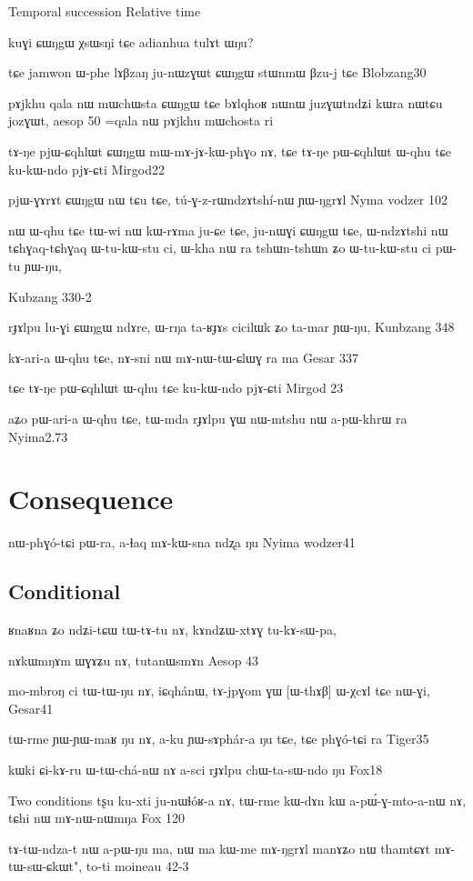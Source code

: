 \documentclass[oldfontcommands,oneside,a4paper,11pt]{memoir}
\begin{document}
Temporal succession
Relative time

kuɣi ɕɯŋgɯ χsɯsŋi tɕe adianhua tulɤt ɯŋu?


tɕe jamwon ɯ-phe lɤβzaŋ ju-nɯzɣɯt ɕɯŋgɯ stɯnmɯ βzu-j tɕe
Blobzang30

pɤjkhu qala nɯ mɯchɯsta ɕɯŋgɯ tɕe bɤlqhoʁ nɯnɯ juzɣɯtndʑi kɯra nɯtɕu jozɣɯt, aesop 50 =qala nɯ pɤjkhu mɯchosta ri

tɤ-ŋe	pjɯ-ɕqhlɯt	ɕɯŋgɯ	mɯ-mɤ-jɤ-kɯ-phɣo	nɤ, tɕe	tɤ-ŋe	pɯ-ɕqhlɯt	ɯ-qhu	tɕe	ku-kɯ-ndo	pjɤ-ɕti
Mirgod22

pjɯ-ɣɤrɤt	ɕɯŋgɯ	nɯ	tɕu	tɕe,	tú-ɣ-z-rɯndzɤtshí-nɯ	ɲɯ-ŋgrɤl	
Nyma vodzer 102


nɯ	ɯ-qhu	tɕe	tɯ-wi	nɯ	kɯ-rɤma	ju-ɕe	tɕe,	ju-nɯɣi	ɕɯŋgɯ	tɕe,
	ɯ-ndzɤtshi	nɯ	tɕhɣaq-tɕhɣaq	ɯ-tu-kɯ-stu	ci,
ɯ-kha	nɯ	ra	tshɯn-tshɯn	ʑo	ɯ-tu-kɯ-stu	ci	pɯ-tu	ɲɯ-ŋu,


Kubzang 330-2


rɟɤlpu	lu-ɣi	ɕɯŋgɯ	ndɤre,	ɯ-rŋa	ta-ʁɟɤs	cicilɯk	ʑo	ta-mar	ɲɯ-ŋu,
Kunbzang 348


	kɤ-ari-a	ɯ-qhu	tɕe,	nɤ-sni	nɯ	mɤ-nɯ-tɯ-ɕlɯɣ	ra	ma
Gesar 337

tɕe	tɤ-ŋe	pɯ-ɕqhlɯt	ɯ-qhu	tɕe	ku-kɯ-ndo	pjɤ-ɕti
Mirgod 23

aʑo	pɯ-ari-a	ɯ-qhu	tɕe,	tɯ-mda	rɟɤlpu	ɣɯ	nɯ-mtshu	nɯ	a-pɯ-khrɯ	ra
Nyima2.73
\section{Consequence}

nɯ-phɣó-tɕi	pɯ-ra, a-ɬaq	mɤ-kɯ-sna	ndʐa	ŋu
Nyima wodzer41

\subsection{Conditional}

ʁnaʁna ʑo ndʑi-tɕɯ tɯ-tɤ-tu nɤ, kɤndʑɯ-xtɤɣ tu-kɤ-sɯ-pa,

nɤkɯmŋɤm ɯɣɤʑu nɤ, tutanɯsmɤn
Aesop 43

mo-mbroŋ	ci	tɯ-tɯ-ŋu	nɤ,	iɕqhánɯ,	tɤ-jpɣom	ɣɯ	[ɯ-thɤβ]	ɯ-χcɤl	tɕe	nɯ-ɣi,
Gesar41

tɯ-rme ɲɯ-ɲɯ-maʁ ŋu nɤ, a-ku ɲɯ-sɤphár-a ŋu tɕe, tɕe phɣó-tɕi ra
Tiger35

kɯki	ɕi-kɤ-ru	ɯ-tɯ-chá-nɯ	nɤ	a-sci	rɟɤlpu	chɯ-ta-sɯ-ndo	ŋu
Fox18	


Two conditions
tʂu	ku-xti	ju-nɯɬóʁ-a	nɤ,	tɯ-rme	kɯ-dɤn	kɯ	a-pɯ́-ɣ-mto-a-nɯ	nɤ, tɕhi	nɯ	mɤ-nɯ-nɯmŋa
Fox 120

tɤ-tɯ-ndza-t	nɯ	a-pɯ-ŋu	ma,	nɯ	ma	kɯ-me	mɤ-ŋgrɤl	manɤʑo	nɯ	thamtɕɤt	mɤ-tɯ-sɯ-ɕkɯt",	to-ti
moineau 42-3
\end{document}
